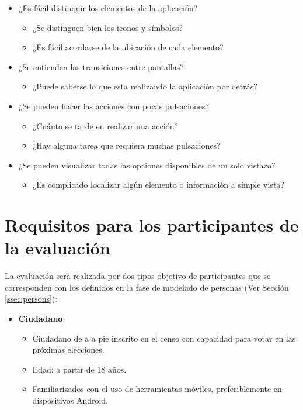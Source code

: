\begin{itemize}
 \item ¿Es fácil distinquir los elementos de la aplicación?
 \begin{itemize}
  \item ¿Se distinguen bien los iconos y símbolos?
  \item ¿Es fácil acordarse de la ubicación de cada elemento?
 \end{itemize}
 \item ¿Se entienden las transiciones entre pantallas?
 \begin{itemize}
  \item ¿Puede saberse lo que esta realizando la aplicación por detrás?
 \end{itemize}
  \item ¿Se pueden hacer las acciones con pocas pulsaciones?
  \begin{itemize}
   \item ¿Cuánto se tarde en realizar una acción?
   \item ¿Hay alguna tarea que requiera muchas pulsaciones?
  \end{itemize}
  \item ¿Se pueden visualizar todas las opciones disponibles de un solo vistazo?
  \begin{itemize}
   \item ¿Es complicado localizar algún elemento o información a simple vista?
  \end{itemize}
 \end{itemize}

\section{Requisitos para los participantes de la evaluación}

La evaluación será realizada por dos tipos objetivo de participantes que se corresponden con los definidos en la fase de modelado de personas (Ver Sección \ref{ssec:persons}):

\begin{itemize}
 \item \textbf{Ciudadano}
 \begin{itemize}
  \item Ciudadano de a a pie inscrito en el censo con capacidad para votar en las próximas elecciones.
  \item Edad: a partir de 18 años.
  \item Familiarizados con el uso de herramientas móviles, preferiblemente en dispositivos Android.
 \end{itemize}
\end{itemize}


